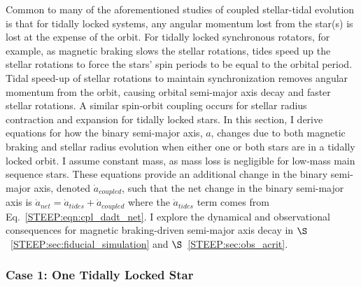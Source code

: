 Common to many of the aforementioned studies of coupled stellar-tidal evolution is that for tidally locked systems, any angular momentum lost from the star(s) is lost at the expense of the orbit.  For tidally locked synchronous rotators, for example, as magnetic braking slows the stellar rotations, tides speed up the stellar rotations to force the stars' spin periods to be equal to the orbital period.  Tidal speed-up of stellar rotations to maintain synchronization removes angular momentum from the orbit, causing orbital semi-major axis decay and faster stellar rotations.  A similar spin-orbit coupling occurs for stellar radius contraction and expansion for tidally locked stars.  In this section, I derive equations for how the binary semi-major axis, $a$, changes due to both magnetic braking and stellar radius evolution when either one or both stars are in a tidally locked orbit.  I assume constant mass, as mass loss is negligible for low-mass main sequence stars.  These equations provide an additional change in the binary semi-major axis, denoted $\dot{a}_{coupled}$, such that the net change in the binary semi-major axis is $\dot{a}_{net} = \dot{a}_{tides} + \dot{a}_{coupled}$ where the $\dot{a}_{tides}$ term comes from \eqtide Eq.~{\ref{STEEP:eqn:cpl_dadt_net}}. I explore the dynamical and observational consequences for magnetic braking-driven semi-major axis decay in $\S$~\ref{STEEP:sec:fiducial_simulation} and $\S$~\ref{STEEP:sec:obs_acrit}.

\subsubsection{Case 1: One Tidally Locked Star}

